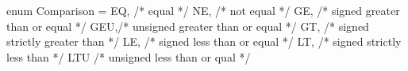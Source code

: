 enum Comparison = {
  EQ, /* equal */
  NE, /* not equal */
  GE, /* signed greater than or equal */
  GEU,/* unsigned greater than or equal */
  GT, /* signed strictly greater than */
  LE, /* signed less than or equal */
  LT, /* signed strictly less than */
  LTU /* unsigned less than or qual */
}
